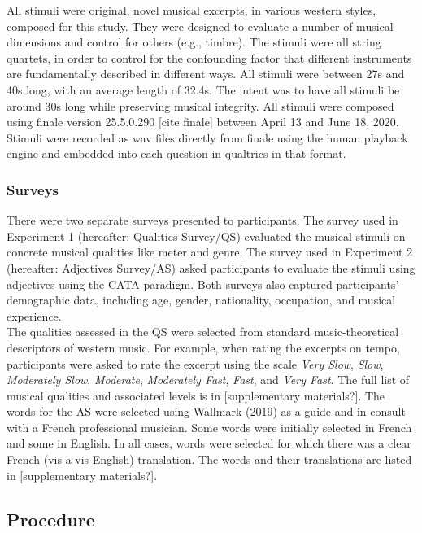 \documentclass[
  english,
  man,floatsintext]{apa6}
\begin{document}
All stimuli were original, novel musical excerpts, in various western styles, composed for this study. They were designed to evaluate a number of musical dimensions and control for others (e.g., timbre). The stimuli were all string quartets, in order to control for the confounding factor that different instruments are fundamentally described in different ways. All stimuli were between 27s and 40s long, with an average length of 32.4s. The intent was to have all stimuli be around 30s long while preserving musical integrity. All stimuli were composed using finale version 25.5.0.290 {[}cite finale{]} between April 13 and June 18, 2020. Stimuli were recorded as wav files directly from finale using the human playback engine and embedded into each question in qualtrics in that format.

\hypertarget{surveys}{%
\subsubsection{Surveys}\label{surveys}}

There were two separate surveys presented to participants. The survey used in Experiment 1 (hereafter: Qualities Survey/QS) evaluated the musical stimuli on concrete musical qualities like meter and genre. The survey used in Experiment 2 (hereafter: Adjectives Survey/AS) asked participants to evaluate the stimuli using adjectives using the CATA paradigm. Both surveys also captured participants' demographic data, including age, gender, nationality, occupation, and musical experience.\\
The qualities assessed in the QS were selected from standard music-theoretical descriptors of western music. For example, when rating the excerpts on tempo, participants were asked to rate the excerpt using the scale \emph{Very Slow}, \emph{Slow}, \emph{Moderately Slow}, \emph{Moderate}, \emph{Moderately Fast}, \emph{Fast}, and \emph{Very Fast}. The full list of musical qualities and associated levels is in {[}supplementary materials?{]}. The words for the AS were selected using Wallmark (2019) as a guide and in consult with a French professional musician. Some words were initially selected in French and some in English. In all cases, words were selected for which there was a clear French (vis-a-vis English) translation. The words and their translations are listed in {[}supplementary materials?{]}.

\hypertarget{procedure}{%
\subsection{Procedure}\label{procedure}}
\end{document}
